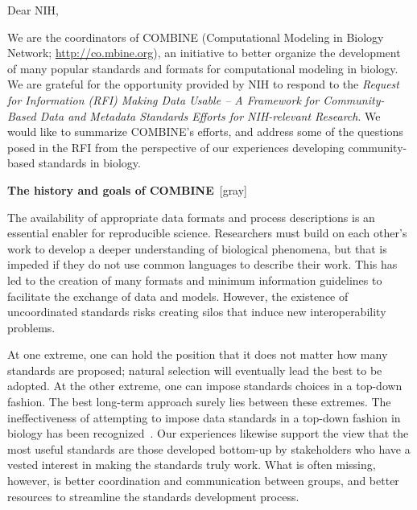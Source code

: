 

\newcommand{\divider}[1]{\vspace{0.25em}\textbf{\large #1}~\xrfill[0pt]{0.5pt}[gray]}
\newcommand{\subdivider}[1]{\vspace{0.25em}\textbf{\textsl{#1}}}
\newcommand{\eg}{e.g.,\xspace}
\newcommand{\idorg}{\href{http://identifiers.org}{\texttt{Identifiers.org}}\xspace}


Dear NIH,

We are the coordinators of COMBINE (Computational Modeling in Biology Network; \url{http://co.mbine.org}), an initiative to better organize the development of many popular standards and formats for computational modeling in biology.  We are grateful for the opportunity provided by NIH to respond to the \emph{Request for Information (RFI) Making Data Usable -- A Framework for Community-Based Data and Metadata Standards Efforts for NIH-relevant Research}.  We would like to summarize COMBINE's efforts, and address some of the questions posed in the RFI from the perspective of our experiences developing community-based standards in biology.


\divider{The history and goals of COMBINE}

The availability of appropriate data formats and process descriptions is an essential enabler for reproducible science.  Researchers must build on each other's work to develop a deeper understanding of biological phenomena, but that is impeded if they do not use common languages to describe their work.  This has led to the creation of many formats and minimum information guidelines to facilitate the exchange of data and models.  However, the existence of uncoordinated standards risks creating silos that induce new interoperability problems.

At one extreme, one can hold the position that it does not matter how many standards are proposed; natural selection will eventually lead the best to be adopted.  At the other extreme, one can impose standards choices in a top-down fashion.  The best long-term approach surely lies between these extremes.  The ineffectiveness of attempting to impose data standards in a top-down fashion in biology has been recognized~\cite{quackenbush_2006b}.  Our experiences likewise support the view that the most useful standards are those developed bottom-up by stakeholders who have a vested interest in making the standards truly work.  What is often missing, however, is better coordination and communication between groups, and better resources to streamline the standards development process.

